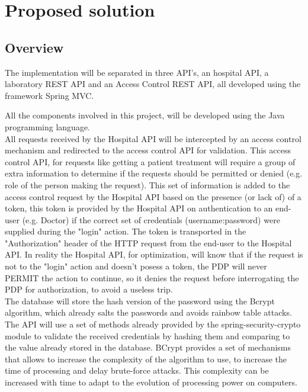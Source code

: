 \section{Proposed solution}

\subsection{Overview}

The implementation will be separated in three API's, an hospital API, a laboratory REST API and an Access Control REST API, all developed using the framework Spring MVC\cite{springmvc}.

All the components involved in this project, will be developed using the Java\cite{java} programming language. \\

All requests received by the Hospital API will be intercepted by an access control mechanism and redirected to the access control API for validation. This access control API, for requests like getting a patient treatment will require a group of extra information to determine if the requests should be permitted or denied (e.g. role of the person making the request).
This set of information is added to the access control request by the Hospital API based on the presence (or lack of) of a token, this token is provided by the Hospital API on authentication to an end-user (e.g. Doctor) if the correct set of credentials (username:password) were supplied during the "login" action. The token is transported in the "Authorization" header of the HTTP request from the end-user to the Hospital API. In reality the Hospital API, for optimization, will know that if the request is not to the "login" action and doesn't posess a token, the PDP will never PERMIT the action to continue, so it denies the request before interrogating the PDP for authorization, to avoid a useless trip. \\

The database will store the hash version of the password using the Bcrypt\cite{bcrypt} algorithm, which already salts the passwords and avoids rainbow table attacks. The API will use a set of methods already provided by the spring-security-crypto\cite{springsecuritycrypto} module to validate the received credentials by hashing them and comparing to the value already stored in the database. BCrypt provides a set of mechanisms that allows to increase the complexity of the algorithm to use, to increase the time of processing and delay brute-force attacks. This complexity can be increased with time to adapt to the evolution of processing power on computers. \\


